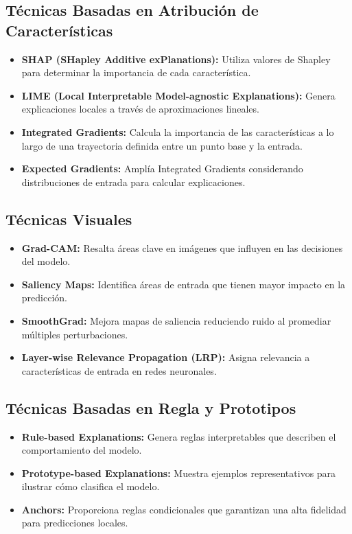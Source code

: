 \begin{refsection}
\subsection{Técnicas Basadas en Atribución de Características}
\begin{itemize}
    \item \textbf{SHAP (SHapley Additive exPlanations):} Utiliza valores de Shapley para determinar la importancia de cada característica.
    \item \textbf{LIME (Local Interpretable Model-agnostic Explanations):} Genera explicaciones locales a través de aproximaciones lineales.
    \item \textbf{Integrated Gradients:} Calcula la importancia de las características a lo largo de una trayectoria definida entre un punto base y la entrada.
    \item \textbf{Expected Gradients:} Amplía Integrated Gradients considerando distribuciones de entrada para calcular explicaciones.
\end{itemize}

\subsection{Técnicas Visuales}
\begin{itemize}
    \item \textbf{Grad-CAM:} Resalta áreas clave en imágenes que influyen en las decisiones del modelo.
    \item \textbf{Saliency Maps:} Identifica áreas de entrada que tienen mayor impacto en la predicción.
    \item \textbf{SmoothGrad:} Mejora mapas de saliencia reduciendo ruido al promediar múltiples perturbaciones.
    \item \textbf{Layer-wise Relevance Propagation (LRP):} Asigna relevancia a características de entrada en redes neuronales.
\end{itemize}

\subsection{Técnicas Basadas en Regla y Prototipos}
\begin{itemize}
    \item \textbf{Rule-based Explanations:} Genera reglas interpretables que describen el comportamiento del modelo.
    \item \textbf{Prototype-based Explanations:} Muestra ejemplos representativos para ilustrar cómo clasifica el modelo.
    \item \textbf{Anchors:} Proporciona reglas condicionales que garantizan una alta fidelidad para predicciones locales.
\end{itemize}


\end{refsection}
